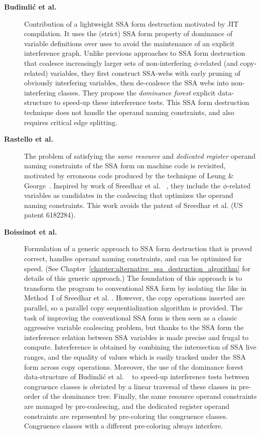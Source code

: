 \begin{description}
\item[\textbf{Budimli\'c et al.~\cite{Budimlic02}}] Contribution of a lightweight SSA form
destruction motivated by JIT compilation. It uses the (strict) SSA form property
of dominance of variable definitions over uses to avoid the maintenance of an
explicit interference graph. Unlike previous approaches to SSA form destruction
that coalesce increasingly larger sets of non-interfering $\phi$-related (and
copy-related) variables, they first construct SSA-webs with early pruning of
obviously interfering variables, then de-coalesce the SSA webs into
non-interfering classes.  They propose the \emph{dominance forest} explicit
data-structure to speed-up these interference tests. This SSA form destruction
technique does not handle the operand naming constraints, and also requires
critical edge splitting.

\item[\textbf{Rastello et al.~\cite{Rastello:2004:CGO}}] The problem of
satisfying the \emph{same resource} and \emph{dedicated register} operand naming
constraints of the SSA form on machine code is revisited, motivated by erroneous code
produced by the technique of Leung \& George~\cite{Leung:1999:PLDI}. Inspired by
work of Sreedhar et al. ~\cite{Sreedhar:1999:SAS}, they include the
$\phi$-related variables as candidates in the coalescing that optimizes the
operand naming constraints.  This work avoids the patent of Sreedhar et al. (US
patent 6182284).


\item[\textbf{Boissinot et al.~\cite{boissinot09revisiting}}] Formulation
of a generic approach to SSA form destruction that is proved correct, handles
operand naming constraints, and can be optimized for speed.
(See Chapter~\ref{chapter:alternative_ssa_destruction_algorithm} for details of
this generic approach.) The foundation of
this approach is to transform the program to conventional SSA form by isolating
the \phifuns like in Method~I of Sreedhar et al.
\cite{Sreedhar:1999:SAS}.  However, the copy operations inserted are parallel,
so a parallel copy sequentialization algorithm is provided. The task of
improving the conventional SSA form is then seen as a classic aggressive
variable coalescing problem, but thanks to the SSA form the
interference relation between SSA variables is made precise and frugal to
compute.  Interference is obtained by combining the intersection of SSA live
ranges, and the equality of values which is easily tracked under the SSA form
across copy operations. Moreover, the use of the dominance forest data-structure
of Budimli\'c et al. ~\cite{Budimlic02} to speed-up interference tests
between congruence classes is obviated by a linear traversal of these classes in
pre-order of the dominance tree. Finally, the same resource operand constraints
are managed by pre-coalescing, and the dedicated register operand constraints
are represented by pre-coloring the congruence classes. Congruence classes with
a different pre-coloring always interfere.

\end{description}

